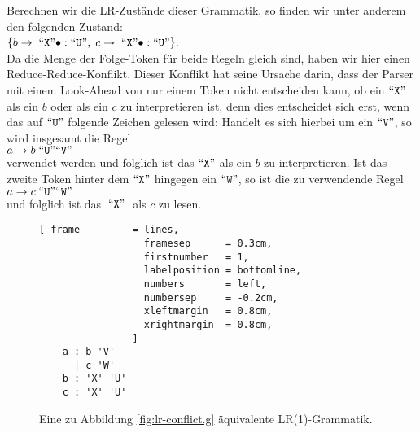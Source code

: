 Berechnen wir die LR-Zust\"ande dieser Grammatik,
so finden wir unter anderem den folgenden Zustand:
\\[0.2cm]
\hspace*{1.3cm}
$\{ b \rightarrow \;\mbox{``\texttt{X}''} \bullet: \mbox{``\texttt{U}''},\; c \rightarrow \;\mbox{``\texttt{X}''} \bullet: \mbox{``\texttt{U}''} \}$.
\\[0.2cm]
Da die Menge der Folge-Token f\"ur beide Regeln gleich sind, haben wir hier einen Reduce-Reduce-Konflikt.
Dieser Konflikt hat seine Ursache darin, dass der Parser mit einem Look-Ahead von nur einem Token nicht
entscheiden kann, ob ein $\mbox{``\texttt{X}''}$ als ein $b$ oder als ein $c$ zu interpretieren ist, denn dies
entscheidet sich erst, wenn das auf $\mbox{``\texttt{U}''}$ folgende Zeichen gelesen wird:  Handelt es sich hierbei
um ein $\mbox{``\texttt{V}''}$, so wird insgesamt die Regel
\\[0.2cm]
\hspace*{1.3cm}
$a \rightarrow b\; \mbox{``\texttt{U}''} \mbox{``\texttt{V}''}$
\\[0.2cm]
verwendet werden und folglich ist das $\mbox{``\texttt{X}''}$ als ein $b$ zu interpretieren. Ist das zweite Token
hinter dem $\mbox{``\texttt{X}''}$ hingegen ein  $\mbox{``\texttt{W}''}$, so ist die zu verwendende Regel
\\[0.2cm]
\hspace*{1.3cm}
$a \rightarrow c \;\mbox{``\texttt{U}''} \mbox{``\texttt{W}''}$
\\[0.2cm]
und folglich ist das $\;\mbox{``\texttt{X}''}\;$ als  $c$ zu lesen.


\begin{figure}[!ht]
\centering
\begin{Verbatim}[ frame         = lines, 
                  framesep      = 0.3cm, 
                  firstnumber   = 1,
                  labelposition = bottomline,
                  numbers       = left,
                  numbersep     = -0.2cm,
                  xleftmargin   = 0.8cm,
                  xrightmargin  = 0.8cm,
                ]
    a : b 'V'
      | c 'W'
    b : 'X' 'U'
    c : 'X' 'U'
\end{Verbatim}
\vspace*{-0.3cm}
\caption{Eine zu Abbildung \ref{fig:lr-conflict.g} \"aquivalente LR(1)-Grammatik.}
\label{fig:lr-conflict-resolved.g}
\end{figure}

